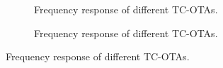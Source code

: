 
\begin{figure}[htbp]
  \centering
  \begin{subfigure}[b]{0.48\linewidth}
    \centering
    \caption{Frequency response of different TC-OTAs.}

  \end{subfigure}
  \hfill
  \begin{subfigure}[b]{0.48\linewidth}
    \centering
    \caption{Frequency response of different TC-OTAs.}

  \end{subfigure}
  \caption{Frequency response of different TC-OTAs.}

  \label{fig:group_ieujb}
\end{figure}
